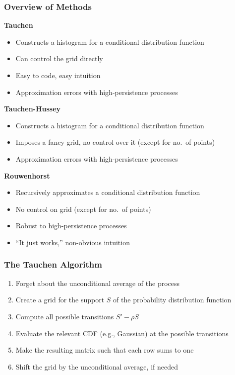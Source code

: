 \documentclass[10pt, aspectratio=1610, handout]{beamer}
\begin{document}
  \begin{frame}
    \frametitle{Overview of Methods}

    \textbf{Tauchen}
    \begin{itemize}
      \item Constructs a histogram for a conditional distribution function
      \item Can control the grid directly
      \item Easy to code, easy intuition
      \item Approximation errors with high-persistence processes
    \end{itemize}

    \vfill\pause

    \textbf{Tauchen-Hussey}
    \begin{itemize}
      \item Constructs a histogram for a conditional distribution function
      \item Imposes a fancy grid, no control over it (except for no.~of points)
      \item Approximation errors with high-persistence processes
    \end{itemize}

    \vfill\pause

    \textbf{Rouwenhorst}
    \begin{itemize}
      \item Recursively approximates a conditional distribution function
      \item No control on grid (except for no.~of points)
      \item Robust to high-persistence processes
      \item ``It just works,'' non-obvious intuition
    \end{itemize}

  \end{frame}

  \begin{frame}
    \frametitle{The Tauchen Algorithm}

    \begin{enumerate}
      \item Forget about the unconditional average of the process \hfill {}
      \vfill\pause
      \item Create a grid for the support $S$ of the probability distribution function \hfill {}
      \vfill\pause
      \item Compute all possible transitions $S' - \rho S$ \hfill {}
      \vfill\pause
      \item Evaluate the relevant CDF (e.g., Gaussian) at the possible transitions
      \vfill\pause
      \item Make the resulting matrix such that each row sums to one
      \vfill\pause
      \item Shift the grid by the unconditional average, if needed
    \end{enumerate}

  \end{frame}
\end{document}
